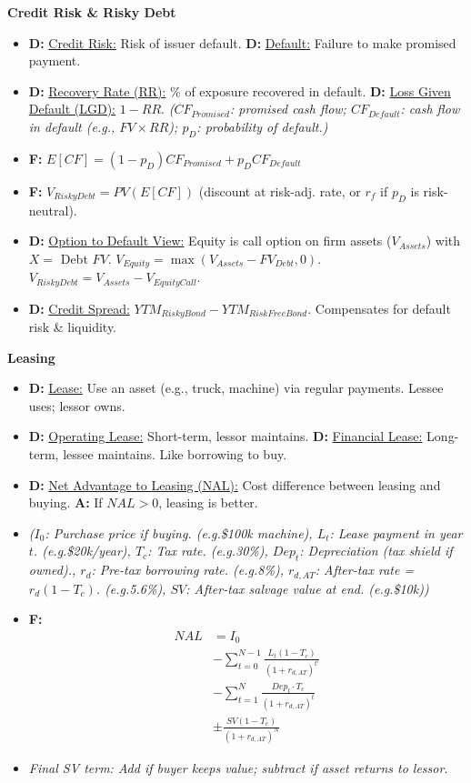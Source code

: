 \documentclass[7pt,landscape]{extarticle} %
\newcommand{\cheatsheetsubsubsection}[1]{%
  \vspace{0.15ex plus 0.05ex minus 0.05ex}%
  \noindent\textbf{\sffamily\scriptsize #1}%
  \par\vspace{0.05ex}%
}
\newcommand{\D}[1]{\textbf{\textcolor{DefColor}{D:}} \uline{#1}}
\newcommand{\F}[1]{\textbf{\textcolor{FormColor}{F:}} #1}
\newcommand{\A}[1]{\textbf{\textcolor{AppColor}{A:}} #1}
\newcommand{\SF}[1]{\textit{\small (#1)}} %
\begin{document}
\begin{multicols*}{4}
  \cheatsheetsubsubsection{Credit Risk \& Risky Debt}
  \begin{itemize}
    \item \D{Credit Risk:} Risk of issuer default. \D{Default:} Failure to make promised payment.
    \item \D{Recovery Rate (RR):} \% of exposure recovered in default. \D{Loss Given Default (LGD):} $1-RR$.
          \SF{$CF_{Promised}$: promised cash flow; $CF_{Default}$: cash flow in default (e.g., $FV \times RR$); $p_D$: probability of default.}
    \item \F{$E[CF] = (1-p_D)CF_{Promised} + p_D CF_{Default}$}
    \item \F{$V_{RiskyDebt} = PV(E[CF])$} (discount at risk-adj. rate, or $r_f$ if $p_D$ is risk-neutral).
    \item \D{Option to Default View:} Equity is call option on firm assets ($V_{Assets}$) with $X=$ Debt $FV$. $V_{Equity} = \max(V_{Assets} - FV_{Debt}, 0)$. $V_{RiskyDebt} = V_{Assets} - V_{EquityCall}$.
    \item \D{Credit Spread:} $YTM_{RiskyBond} - YTM_{RiskFreeBond}$. Compensates for default risk \& liquidity.
  \end{itemize}
  
  \cheatsheetsubsubsection{Leasing}
\begin{itemize}
  \item \D{Lease:} Use an asset (e.g., truck, machine) via regular payments. Lessee uses; lessor owns.
  
  \item \D{Operating Lease:} Short-term, lessor maintains.  
        \D{Financial Lease:} Long-term, lessee maintains. Like borrowing to buy.

  \item \D{Net Advantage to Leasing (NAL):}  
        Cost difference between leasing and buying.  
        \A{If $NAL > 0$, leasing is better.}

  \item \SF{$I_0$: Purchase price if buying. (e.g.\$100k machine), $L_t$: Lease payment in year $t$. (e.g.\$20k/year), $T_c$: Tax rate. (e.g.30\%), $Dep_t$: Depreciation (tax shield if owned)., $r_d$: Pre-tax borrowing rate. (e.g.8\%), $r_{d,AT}$: After-tax rate = $r_d(1 - T_c)$. (e.g.5.6\%), $SV$: After-tax salvage value at end. (e.g.\$10k)}
  \item \F{
    \begin{align*}
      NAL &= I_0 \\
          &- \sum_{t=0}^{N-1} \frac{L_t(1 - T_c)}{(1 + r_{d,AT})^{t'}} \\
          &- \sum_{t=1}^{N} \frac{Dep_t \cdot T_c}{(1 + r_{d,AT})^t} \\
          &\pm \frac{SV(1 - T_c)}{(1 + r_{d,AT})^N}
    \end{align*}
  }
  \item \textit{Final SV term: Add if buyer keeps value; subtract if asset returns to lessor.}
\end{itemize}



\end{multicols*}
\end{document}
